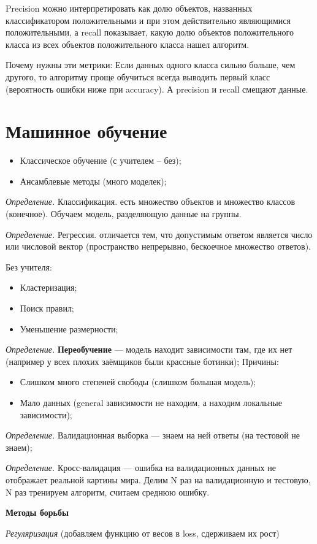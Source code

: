 \documentclass[a4paper,14pt]{article}
\begin{document}
Precision можно интерпретировать как долю объектов, названных классификатором положительными и при этом действительно являющимися положительными, а recall показывает, какую долю объектов положительного класса из всех объектов положительного класса нашел алгоритм.

Почему нужны эти метрики: Если данных одного класса сильно больше, чем другого, то алгоритму проще обучиться всегда выводить первый класс (вероятность ошибки ниже при accuracy). А precision и recall смещают данные.

\section{Машинное обучение}
\begin{itemize}
    \item Классическое обучение (с учителем -- без);
    \item Ансамблевые методы (много моделек);
\end{itemize}

{\it Определение.}  Классификация. есть множество объектов и множество классов (конечное). Обучаем модель, разделяющую данные на группы.

{\it Определение.}  Регрессия. отличается тем, что допустимым ответом является число или числовой вектор (пространство непрерывно, бескоечное множество ответов).

Без учителя:
\begin{itemize}
    \item Кластеризация;
    \item Поиск правил;
    \item Уменьшение размерности;
\end{itemize}


{\it Определение.} {\bf Переобучение } --- модель находит зависимости там, где их нет (например у всех плохих заёмщиков были крассные ботинки);
Причины:
\begin{itemize}
    \item Слишком много степеней свободы (слишком большая модель);
    \item Мало данных (general зависимости не находим, а находим локальные зависимости);
\end{itemize}

{\it Определение.} Валидационная выборка --- знаем на ней ответы (на тестовой не знаем);

{\it Определение.} Кросс-валидация --- ошибка на валидационных данных не отображает реальной картины мира.
Делим N раз на валидационную и тестовую, N раз тренируем алгоритм, считаем среднюю ошибку.

{\bf Методы борьбы}

{\it Регуляризация} (добавляем функцию от весов в loss, сдерживаем их рост)
\end{document}

